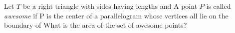 Let $T$ be a right triangle with sides having lengths   and  A point $P$ is called \textit{awesome} if P is the center of a parallelogram whose vertices all lie on the boundary of  What is the area of the set of awesome points?